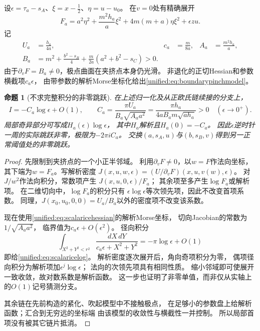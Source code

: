 \documentclass[11pt,a4paper,oneside]{ctexart}
\theoremstyle{cnplain}
\newtheorem{proposition}[theorem]{命题}
\theoremstyle{definition}
\theoremstyle{remark}
\numberwithin{equation}{section}
\begin{document}
设$\epsilon=\tau_a-s_A$、$\xi=x-\tfrac12$、$\eta=u-u_0$。
在$v=0$处有精确展开
\begin{equation}\label{unified:eq:scalaricehessian}
 F_a=a^2\eta^2+\frac{m^2h_a}{a}\xi^2
       +4m(m+a)\eta\xi^2+\epsilon zu.
\end{equation}
记
\begin{align}
 U_a&=\frac{h_a}{4a},&
 c_a&=\frac{m}{8a},&
 A_a&=\frac{m^2h_a}{a},\nonumber\\
 B_a&=m^2+\frac{b^2-s_B}{4}
             +\frac{m}{2a}(a^2+b^2-s_C)>0.\label{unified:eq:scalariceconstants}
\end{align}
由于$\partial_vF=B_a\ne0$，极点曲面在夹挤点本身仍光滑。
非退化的正切Hessian和参数横截项$c_a\epsilon$，
由带参数的解析Morse坐标化给出\eqref{unified:eq:boundarypinchmodel}。

\begin{proposition}[不求完整积分的非零跳跃]\label{unified:prop:scalaricelog}
在上述归一化及从正欧氏链续接的分支上，
\begin{equation}\label{unified:eq:scalaricelog}
 I=-C_a\log\epsilon+O(1),\qquad
 C_a=\frac{\pi U_a}{B_a\sqrt{A_aa^2}}
     =\frac{\pi h_a}{4a B_a m\sqrt{a h_a}}>0
 \quad(\epsilon\longrightarrow0^+).
\end{equation}
局部奇异部分可写成$H_a(\epsilon)\log\epsilon$，
其中$H_a$解析且$H_a(0)=-C_a$。
因此$\epsilon$逆时针一周的实际跳跃非零，极限为$-2\pi iC_a$。
交换$(a,s_A,u)$与$(b,s_B,v)$得到另一正常阈值处的非零跳跃。
\end{proposition}
\begin{proof}
先限制到夹挤点的一个小正半邻域。
利用$\partial_vF\ne0$，以$w=F$作法向坐标，
其下端为$w=F_a$。写解析密度
$J(x,u,w,\epsilon)=(U/\partial_vF)(x,u,v(w),\epsilon)$。
对$J/w^2$作法向积分，常数项产生
$J(x,u,0,\epsilon)/F_a$；
其余项至多产生$\log F_a$或解析项。
在二维切向中，$\log F_a$的积分只有
$\epsilon\log\epsilon$等次领先项，因此不改变首项系数。
同理，$J(x_0,u_0,0,0)=U_a/B_a$以外的密度项不改变该系数。

现在使用\eqref{unified:eq:scalaricehessian}的解析Morse坐标，
切向Jacobian的常数为$1/\sqrt{A_aa^2}$，
临界值为$c_a\epsilon+O(\epsilon^2)$。
径向积分
\[
 \int_{X^2+Y^2<r^2}
       \frac{dX\,dY}{c_a\epsilon+X^2+Y^2}
       =-\pi\log\epsilon+O(1)
\]
即给\eqref{unified:eq:scalaricelog}。
解析密度逐次展开后，角向奇项积分为零，
偶项径向积分为解析项加$\epsilon^j\log\epsilon$；
法向的次领先项具有相同性质。
缩小邻域即可使展开一致收敛，故对数系数是解析函数。
这一步也证明了非零单值，而非仅从实轴上的$O(1)$记号猜测分支。

其余链在先前构造的紧化、吹起模型中不接触极点，
在足够小的参数盘上给解析函数；汇合到无穷远的坐标端
由该模型的收敛性与横截性一并控制。
所以局部首项没有被其它链片抵消。
\end{proof}
\end{document}
